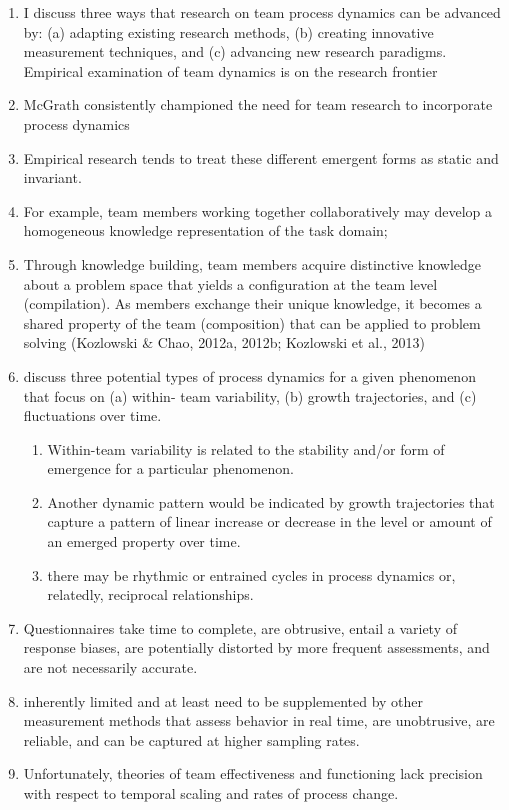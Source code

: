 \documentclass[12pt]{article}
\begin{document}
\begin{enumerate}
    \item  I discuss three ways that research on team process dynamics can be advanced by: (a) adapting existing research methods, (b) creating innovative measurement techniques, and (c) advancing new research paradigms. Empirical examination of team dynamics is on the research frontier
    \item McGrath consistently championed the need for team research to incorporate process dynamics
    \item Empirical research tends to treat these different emergent forms as static and invariant.
    \item For example, team members working together collaboratively may develop a homogeneous knowledge representation of the task domain;
    \item Through knowledge building, team members acquire distinctive knowledge about a problem space that yields a configuration at the team level (compilation). As members exchange their unique knowledge, it becomes a shared property of the team (composition) that can be applied to problem solving (Kozlowski \& Chao, 2012a, 2012b; Kozlowski et al., 2013)
    \item discuss three potential types of process dynamics for a given phenomenon that focus on (a) within- team variability, (b) growth trajectories, and (c) fluctuations over time. 
    \begin{enumerate}
        \item Within-team variability is related to the stability and/or form of emergence for a particular phenomenon. 
        \item Another dynamic pattern would be indicated by growth trajectories that capture a pattern of linear increase or decrease in the level or amount of an emerged property over time.
        \item  there may be rhythmic or entrained cycles in process dynamics or, relatedly, reciprocal relationships.
    \end{enumerate}
    \item Questionnaires take time to complete, are obtrusive, entail a variety of response biases, are potentially distorted by more frequent assessments, and are not necessarily accurate.
    \item inherently limited and at least need to be supplemented by other measurement methods that assess behavior in real time, are unobtrusive, are reliable, and can be captured at higher sampling rates.
    \item Unfortunately, theories of team effectiveness and functioning lack precision with respect to temporal scaling and rates of process change.
\end{enumerate}
\end{document}
